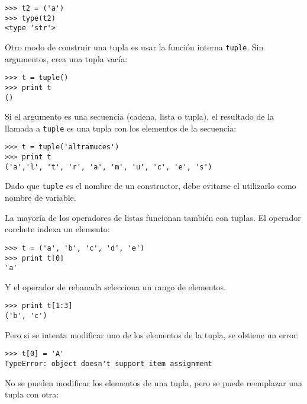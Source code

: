 \beforeverb
\begin{verbatim}
>>> t2 = ('a')
>>> type(t2)
<type 'str'>
\end{verbatim}
\afterverb
%
Otro modo de construir una tupla es usar la función interna {\tt tuple}.
Sin argumentos, crea una tupla vacía:


\beforeverb
\begin{verbatim}
>>> t = tuple()
>>> print t
()
\end{verbatim}
\afterverb
%
Si el argumento es una secuencia (cadena, lista o tupla), el resultado
de la llamada a {\tt tuple} es una tupla con los elementos de la secuencia:

\beforeverb
\begin{verbatim}
>>> t = tuple('altramuces')
>>> print t
('a','l', 't', 'r', 'a', 'm', 'u', 'c', 'e', 's')
\end{verbatim}
\afterverb
%
Dado que {\tt tuple} es el nombre de un constructor, debe evitarse
el utilizarlo como nombre de variable.

La mayoría de los operadores de listas funcionan también con tuplas. El operador corchete
indexa un elemento:


\beforeverb
\begin{verbatim}
>>> t = ('a', 'b', 'c', 'd', 'e')
>>> print t[0]
'a'
\end{verbatim}
\afterverb
%
Y el operador de rebanada selecciona un rango de elementos.


\beforeverb
\begin{verbatim}
>>> print t[1:3]
('b', 'c')
\end{verbatim}
\afterverb
%
Pero si se intenta modificar uno de los elementos de la tupla, se
obtiene un error:


\beforeverb
\begin{verbatim}
>>> t[0] = 'A'
TypeError: object doesn't support item assignment
\end{verbatim}
\afterverb
%
No se pueden modificar los elementos de una tupla, pero se puede
reemplazar una tupla con otra:

